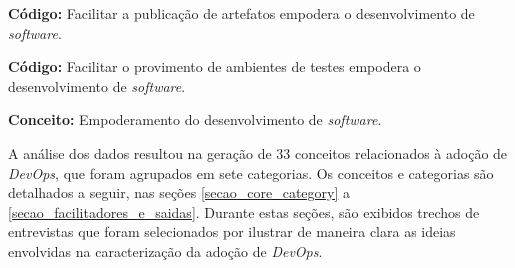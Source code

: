 {\bf Código:} Facilitar a publicação de artefatos empodera o desenvolvimento de
{\it software}.

{\bf Código:} Facilitar o provimento de ambientes de testes empodera o
desenvolvimento de {\it software}.

{\bf Conceito:} Empoderamento do desenvolvimento de {\it software}.

A análise dos dados resultou na geração de 33 conceitos relacionados à adoção
de {\it DevOps}, que foram agrupados em sete categorias. Os conceitos e
categorias são detalhados a seguir, nas seções \ref{secao_core_category} a
\ref{secao_facilitadores_e_saidas}. Durante estas seções, são exibidos trechos
de entrevistas que foram selecionados por ilustrar de maneira clara as ideias
envolvidas na caracterização da adoção de {\it DevOps}.






